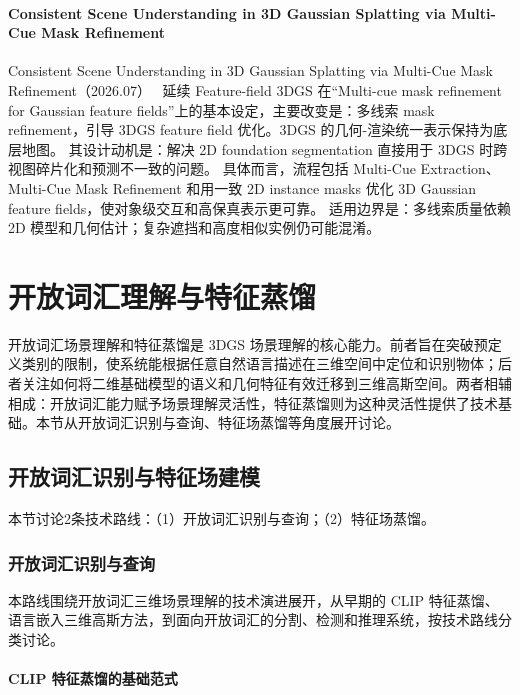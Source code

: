 \paragraph{Consistent Scene Understanding in 3D Gaussian Splatting via Multi-Cue Mask Refinement}
Consistent Scene Understanding in 3D Gaussian Splatting via Multi-Cue Mask Refinement（2026.07）~\cite{2607_01708} 延续 Feature-field 3DGS 在“Multi-cue mask refinement for Gaussian feature fields”上的基本设定，主要改变是：多线索 mask refinement，引导 3DGS feature field 优化。3DGS 的几何-渲染统一表示保持为底层地图。
其设计动机是：解决 2D foundation segmentation 直接用于 3DGS 时跨视图碎片化和预测不一致的问题。
具体而言，流程包括 Multi-Cue Extraction、Multi-Cue Mask Refinement 和用一致 2D instance masks 优化 3D Gaussian feature fields，使对象级交互和高保真表示更可靠。
适用边界是：多线索质量依赖 2D 模型和几何估计；复杂遮挡和高度相似实例仍可能混淆。
\section{开放词汇理解与特征蒸馏}
\label{sec:10_3}

开放词汇场景理解和特征蒸馏是 3DGS 场景理解的核心能力。前者旨在突破预定义类别的限制，使系统能根据任意自然语言描述在三维空间中定位和识别物体；后者关注如何将二维基础模型的语义和几何特征有效迁移到三维高斯空间。两者相辅相成：开放词汇能力赋予场景理解灵活性，特征蒸馏则为这种灵活性提供了技术基础。本节从开放词汇识别与查询、特征场蒸馏等角度展开讨论。

\subsection{开放词汇识别与特征场建模}
\label{ss:10_3}

本节讨论2条技术路线：（1）开放词汇识别与查询；（2）特征场蒸馏。

\subsubsection{开放词汇识别与查询}

本路线围绕开放词汇三维场景理解的技术演进展开，从早期的 CLIP 特征蒸馏、语言嵌入三维高斯方法，到面向开放词汇的分割、检测和推理系统，按技术路线分类讨论。

\paragraph{CLIP 特征蒸馏的基础范式}

